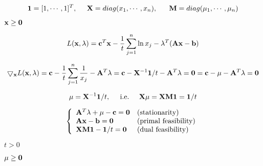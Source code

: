 {\newpage\clearpage
{}%
\begin{displaymath}
{\bf 1}=[1,\cdots,1]^T,\;\;\;\;\;{\bf X}=diag(x_1,\cdots,x_n),
\;\;\;\;\;\;{\bf M}=diag(\mu_1,\cdots,\mu_n)
\end{displaymath}%
\lthtmldisplayZ
\lthtmlcheckvsize\clearpage}

{\newpage\clearpage
{}%
${\bf x}\ge{\bf0}$%
\lthtmlinlinemathZ
\lthtmlcheckvsize\clearpage}

{\newpage\clearpage
{}%
\begin{displaymath}
L({\bf x},{\bf\lambda})={\bf c}^T{\bf x}-\frac{1}{t}\sum_{j=1}^n\ln x_j
-{\bf\lambda}^T({\bf Ax}-{\bf b})
\end{displaymath}%
\lthtmldisplayZ
\lthtmlcheckvsize\clearpage}

{\newpage\clearpage
{}%
\begin{displaymath}
\bigtriangledown_{\bf x} L({\bf x},{\bf\lambda})
={\bf c}-\frac{1}{t}\sum_{j=1}^n\frac{1}{x_j}-{\bf A}^T{\bf\lambda}
={\bf c}-{\bf X}^{-1}{\bf 1}/t-{\bf A}^T{\bf\lambda}={\bf0}
={\bf c}-{\bf\mu}-{\bf A}^T{\bf\lambda}={\bf0}
\end{displaymath}%
\lthtmldisplayZ
\lthtmlcheckvsize\clearpage}

{\newpage\clearpage
{}%
\begin{displaymath}
{\bf\mu}={\bf X}^{-1}{\bf 1}/t,\;\;\;\;\;\mbox{i.e.}\;\;\;\;\;
{\bf X}{\bf\mu}={\bf X}{\bf M}{\bf 1}={\bf 1}/t
\end{displaymath}%
\lthtmldisplayZ
\lthtmlcheckvsize\clearpage}

{\newpage\clearpage
{}%
\begin{displaymath}
\left\{\begin{array}{ll}
{\bf A}^T{\bf\lambda}+{\bf\mu}-{\bf c}={\bf0} & \mbox{(stationarity)}\\
{\bf Ax}-{\bf b}={\bf0} &\mbox{(primal feasibility)}\\
{\bf XM1}-{\bf 1}/t={\bf0} & \mbox{(dual feasibility)}
\end{array}\right.
\end{displaymath}%
\lthtmldisplayZ
\lthtmlcheckvsize\clearpage}

{\newpage\clearpage
{}%
$t>0$%
\lthtmlinlinemathZ
\lthtmlcheckvsize\clearpage}

{\newpage\clearpage
{}%
${\bf\mu}\ge{\bf0}$%
\lthtmlinlinemathZ
\lthtmlcheckvsize\clearpage}

